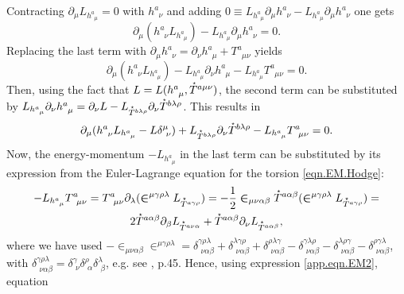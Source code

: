\documentclass[
10pt, %
a4paper, %
oneside, %
headinclude,footinclude, %
BCOR5mm, %
]{scrartcl}
\newcommand{\pd}[1]{\partial_{#1}}
\newcommand{\tetrsymbol}{h}
\newcommand{\tetr}[2]{\tetrsymbol^{#1}_{\phantom{#1}#2}}
\newcommand{\Tors}[2]{T^{#1}_{\phantom{a}#2}}
\newcommand{\Laghodge}{L}%
\newcommand{\LCsymb}{\bm{\in}}    %
\newcommand{\HDT}[1]{\accentset{\star}{T}^{#1}}
\newcommand{\KD}[2]{\delta^{#1}_{\,\,#2}}
\begin{document}
Contracting $ \pd{\mu} \Laghodge_{\tetr{a}{\mu}} = 0 $ with $ \tetr{a}{\nu} $ and adding $ 0\equiv 
\Laghodge_{\tetr{a}{\mu}}\pd{\mu}\tetr{a}{\nu} -  \Laghodge_{\tetr{a}{\mu}}\pd{\mu}\tetr{a}{\nu} $ 
one gets
\begin{equation}
\pd{\mu}(\tetr{a}{\nu}\Laghodge_{\tetr{a}{\mu}}) - \Laghodge_{\tetr{a}{\mu}}\pd{\mu}\tetr{a}{\nu} = 
0.
\end{equation}
Replacing the last term with $ \pd{\mu}\tetr{a}{\nu} = \pd{\nu}\tetr{a}{\mu} + \Tors{a}{\mu\nu} $ 
yields
\begin{equation}
\pd{\mu}(\tetr{a}{\nu}\Laghodge_{\tetr{a}{\mu}}) - \Laghodge_{\tetr{a}{\mu}}\pd{\nu}\tetr{a}{\mu} - 
\Laghodge_{\tetr{a}{\mu}}\Tors{a}{\mu\nu} = 0.
\end{equation}
Then, using the fact that $ L = L(\tetr{a}{\mu},\HDT{a\mu\nu}) $, the second term can be 
substituted 
by $ \Laghodge_{\tetr{a}{\mu}}\pd{\nu}\tetr{a}{\mu} = \pd{\nu}\Laghodge - 
\Laghodge_{\HDT{b\lambda\rho}}\pd{\nu}\HDT{b\lambda\rho} $. This results in
\begin{equation}\label{app.eqn.EM1}
\pd{\mu}(\tetr{a}{\nu}\Laghodge_{\tetr{a}{\mu}} - L \delta^\mu_{\ \nu}) +
\Laghodge_{\HDT{b\lambda\rho}}\pd{\nu}\HDT{b\lambda\rho} -
\Laghodge_{\tetr{a}{\mu}}\Tors{a}{\mu\nu} = 0.
\end{equation} 
Now, the energy-momentum $ -\Laghodge_{\tetr{a}{\mu}} $ in the last term can be substituted by its 
expression from the Euler-Lagrange equation for the torsion \eqref{eqn.EM.Hodge}:
\begin{multline}\label{app.eqn.EM2}
	-\Laghodge_{\tetr{a}{\mu}}\Tors{a}{\mu\nu} = 
	\Tors{a}{\mu\nu}\pd{\lambda}(\LCsymb^{\mu\gamma\rho\lambda}\Laghodge_{\HDT{a\gamma\rho}}) =
	-\frac12\LCsymb_{\mu\nu\alpha\beta}\HDT{a\alpha\beta}(\LCsymb^{\mu\gamma\rho\lambda}\Laghodge_{\HDT{a\gamma\rho}})
	 =
	 \\
	2\HDT{a\alpha\beta}\pd{\beta}\Laghodge_{\HDT{a\nu\alpha}} + 
	\HDT{a\alpha\beta}\pd{\nu}\Laghodge_{\HDT{a\alpha\beta}},
\end{multline}
where we have used  $ 
-\LCsymb_{\mu\nu\alpha\beta}\LCsymb^{\mu\gamma\rho\lambda} = 
\KD{\gamma\rho\lambda}{\nu\alpha\beta} +
\KD{\lambda\gamma\rho}{\nu\alpha\beta} +
\KD{\rho\lambda\gamma}{\nu\alpha\beta} -
\KD{\gamma\lambda\rho}{\nu\alpha\beta} -
\KD{\lambda\rho\gamma}{\nu\alpha\beta} -
\KD{\rho\gamma\lambda}{\nu\alpha\beta}
$, with $ \KD{\gamma\rho\lambda}{\nu\alpha\beta} = 
\KD{\gamma}{\nu}\KD{\rho}{\alpha}\KD{\lambda}{\beta} $, e.g. see \cite{KleinertMultivalued}, p.45. 
Hence, using expression \eqref{app.eqn.EM2}, equation 
\end{document}
